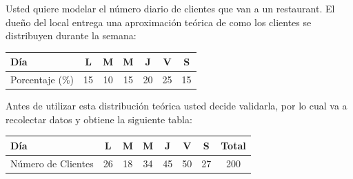 \documentclass[11pt]{exam}
\begin{document}
\begin{questions}

\question Usted quiere modelar el n\'umero diario de clientes que van a un restaurant. El due\~no del local entrega una aproximaci\'on te\'orica de como los clientes se distribuyen durante la semana:

\begin{table}[!htbp]
\centering
\begin{tabular}{lcccccc}
\toprule
D\'ia&L&M&M&J&V&S\\
\midrule
Porcentaje (\%) & 15 & 10 & 15 & 20 & 25 & 15\\
\bottomrule
\end{tabular}
\end{table}

Antes de utilizar esta distribuci\'on te\'orica usted decide validarla, por lo cual va a recolectar datos y obtiene la siguiente tabla:

\begin{table}[!htbp]
\centering
\begin{tabular}{lccccccc}
\toprule
D\'ia&L&M&M&J&V&S&Total\\
\midrule
N\'umero de Clientes & 26 & 18 & 34 & 45 & 50 & 27 & 200\\
\bottomrule
\end{tabular}
\end{table}

\newpage

\end{questions}
\end{document}

